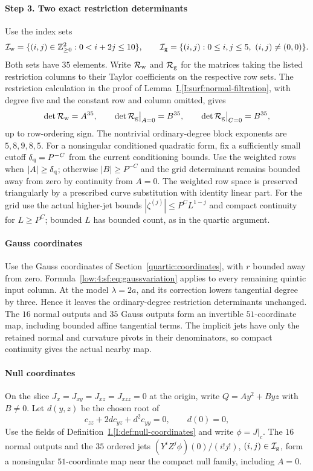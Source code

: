 \documentclass[11pt]{amsart}
\theoremstyle{definition}
\theoremstyle{remark}
\numberwithin{equation}{section}
\newcommand{\partIref}[1]{\hyperref[I:#1]{I.\ref*{I:#1}}}
\begin{document}
\paragraph{Step 3. Two exact restriction determinants}
Use the index sets
\[
 \mathcal I_{\rm w}=\{(i,j)\in\mathbb{Z}_{\ge0}^2:0<i+2j\le10\},\qquad
 \mathcal I_{\rm g}=\{(i,j):0\le i,j\le5,\ (i,j)\ne(0,0)\}.
\]
Both sets have $35$ elements. Write $\mathcal R_{\rm w}$ and $\mathcal R_{\rm g}$ for the matrices taking the listed restriction columns to their Taylor coefficients on the respective row sets. The restriction calculation in the proof of Lemma~\partIref{surf:normal-filtration}, with degree five and the constant row and column omitted, gives
\[
\det\mathcal R_{\rm w}=A^{35},\qquad
\det\mathcal R_{\rm g}\big|_{A=0}=B^{35},\qquad
\det\mathcal R_{\rm g}\big|_{C=0}=B^{35},
\]
up to row-ordering sign. The nontrivial ordinary-degree block exponents are $5,8,9,8,5$. For a nonsingular conditioned quadratic form, fix a sufficiently small cutoff $\delta_{\rm q}=P^{-C}$ from the current conditioning bounds. Use the weighted rows when $|A|\ge\delta_{\rm q}$; otherwise $|B|\ge P^{-C}$ and the grid determinant remains bounded away from zero by continuity from $A=0$. The weighted row space is preserved triangularly by a prescribed curve substitution with identity linear part. For the grid use the actual higher-jet bounds $|\zeta^{(j)}|\le P^CL^{1-j}$ and compact continuity for $L\ge P^C$; bounded $L$ has bounded count, as in the quartic argument.

\paragraph{Gauss coordinates}
Use the Gauss coordinates of Section~\ref{quartic:coordinates}, with $r$ bounded away from zero. Formula~\eqref{low:4:sf:eq:gaussvariation} applies to every remaining quintic input column. At the model $\lambda=2a$, and its correction lowers tangential degree by three. Hence it leaves the ordinary-degree restriction determinants unchanged. The $16$ normal outputs and $35$ Gauss outputs form an invertible $51$-coordinate map, including bounded affine tangential terms. The implicit jets have only the retained normal and curvature pivots in their denominators, so compact continuity gives the actual nearby map.

\paragraph{Null coordinates}\label{low:5:qsc:null-atlas}
On the slice $J_x=J_{xy}=J_{xz}=J_{xzz}=0$ at the origin, write $Q=Ay^2+Byz$ with $B\ne0$. Let $d(y,z)$ be the chosen root of
\[
c_{zz}+2dc_{yz}+d^2c_{yy}=0,\qquad d(0)=0,
\]
Use the fields of Definition~\partIref{def:null-coordinates} and write $\phi=J|_c$. The $16$ normal outputs and the $35$ ordered jets $(Y^iZ^j\phi)(0)/(i!j!)$, $(i,j)\in\mathcal I_{\rm g}$, form a nonsingular $51$-coordinate map near the compact null family, including $A=0$.
\end{document}
